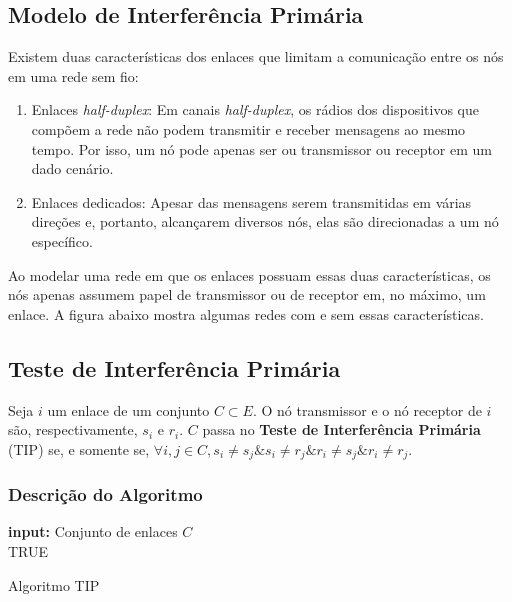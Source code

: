 \subsection{Modelo de Interferência Primária}

Existem duas características dos enlaces que limitam a comunicação entre os nós em uma rede sem fio: 

\begin{enumerate}

\item Enlaces {\it half-duplex}: Em canais {\it half-duplex}, os rádios dos dispositivos que compõem a rede não podem transmitir e receber mensagens ao mesmo tempo. Por isso, um nó pode apenas ser ou transmissor ou receptor em um dado cenário.
 
\item Enlaces dedicados: Apesar das mensagens serem transmitidas em várias direções e, portanto, alcançarem diversos nós, elas são direcionadas a um nó específico. 
\end{enumerate}

Ao modelar uma rede em que os enlaces possuam essas duas características, os nós apenas assumem papel de transmissor ou de receptor em, no máximo, um enlace. A figura abaixo mostra algumas redes com e sem essas características.


\subsection{Teste de Interferência Primária}

Seja $i$ um enlace de um conjunto $C \subset E$. O nó transmissor e o nó receptor de $i$ são, respectivamente, $s_{i}$ e $r_{i}$. $C$ passa no {\bf Teste de Interferência Primária} (TIP) se, e somente se, $\forall i,j \in C, s_{i} \neq s_{j} \& s_{i} \neq r_{j} \& r_{i} \neq s_{j} \& r_{i} \neq r_{j}$. 

\subsubsection{Descrição do Algoritmo}

\begin{algorithm}[h]
	\SetVline
	{\bf input:} Conjunto de enlaces $C$\\
	\Return TRUE
\caption{Algoritmo TIP}
\label{alg:tip}
\end{algorithm}

